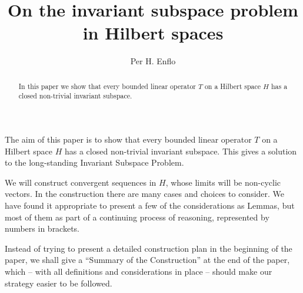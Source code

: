 \documentclass[12pt,oneside,reqno]{amsart}
\theoremstyle{definition}
\begin{document}
\title[On the invariant subspace problem in Hilbert spaces]{On the invariant subspace problem\\ in Hilbert spaces}
\author[Enflo]{Per H. Enflo}
\address[Per H. Enflo]{\mbox{}\newline \indent Department of Mathematical Sciences,\newline\indent  Kent State University, \newline\indent Kent, Ohio, 44242, USA.\newline \indent
	\textsc{ and }\newline \indent  \noindent Instituto de Matem\'atica Interdisciplinar (IMI), \newline \indent Facultad de Ciencias Matem\'{a}ticas \newline \indent Plaza de Ciencias 3 \newline \indent Universidad Complutense de Madrid \newline \indent	Madrid, 28040 (Spain)
}
\begin{abstract}
In this paper we show that every bounded linear operator $T$ on a Hilbert space $H$ has a closed non-trivial invariant subspace.
\end{abstract} 
\maketitle

The aim of this paper is to show that every bounded linear operator $T$ on a Hilbert space $H$ has a closed non-trivial invariant subspace. This gives a solution to the long-standing Invariant Subspace Problem.  

We will construct convergent sequences in $H$, whose limits will be non-cyclic vectors. In the construction there are many cases and choices to consider. We have found it appropriate to present a few of the considerations as Lemmas, but most of them as part of a continuing process of reasoning, represented by numbers in brackets.

Instead  of trying to present a detailed construction plan in the beginning of the paper, we shall give a ``Summary of the Construction'' at the end of the paper, which -- with all definitions and considerations in place -- should make our strategy easier to be followed.
\end{document}
